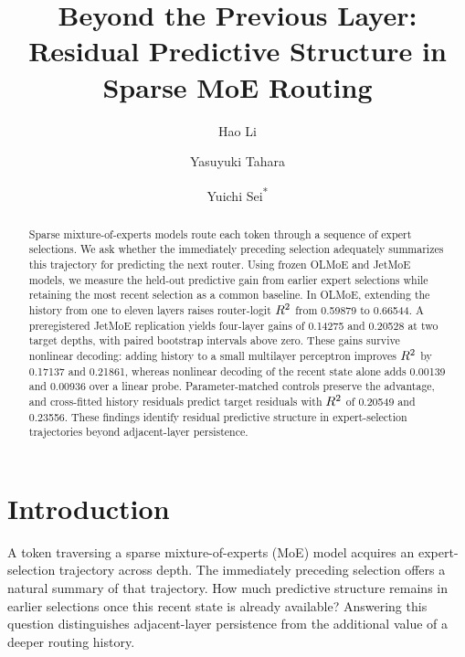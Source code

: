 \documentclass[10pt,letterpaper,twocolumn]{yalearxiv}
\title{Beyond the Previous Layer:\\Residual Predictive Structure in Sparse MoE Routing}
\author[1]{Hao Li}
\author[1]{Yasuyuki Tahara}
\author[1]{Yuichi Sei\textsuperscript{*}}
\affil[1]{Department of Informatics, Graduate School of Informatics and Engineering,\\
The University of Electro-Communications, Tokyo, Japan}
\begin{document}
\begin{abstract}
Sparse mixture-of-experts models route each token through a sequence of expert selections. We ask whether the immediately preceding selection adequately summarizes this trajectory for predicting the next router. Using frozen OLMoE and JetMoE models, we measure the held-out predictive gain from earlier expert selections while retaining the most recent selection as a common baseline. In OLMoE, extending the history from one to eleven layers raises router-logit $R^2$ from 0.59879 to 0.66544. A preregistered JetMoE replication yields four-layer gains of 0.14275 and 0.20528 at two target depths, with paired bootstrap intervals above zero. These gains survive nonlinear decoding: adding history to a small multilayer perceptron improves $R^2$ by 0.17137 and 0.21861, whereas nonlinear decoding of the recent state alone adds 0.00139 and 0.00936 over a linear probe. Parameter-matched controls preserve the advantage, and cross-fitted history residuals predict target residuals with $R^2$ of 0.20549 and 0.23556. These findings identify residual predictive structure in expert-selection trajectories beyond adjacent-layer persistence.
\end{abstract}
\maketitle
\begingroup
\renewcommand{\thefootnote}{*}
\endgroup

\section{Introduction}
A token traversing a sparse mixture-of-experts (MoE) model acquires an expert-selection trajectory across depth. The immediately preceding selection offers a natural summary of that trajectory. How much predictive structure remains in earlier selections once this recent state is already available? Answering this question distinguishes adjacent-layer persistence from the additional value of a deeper routing history.
\end{document}
